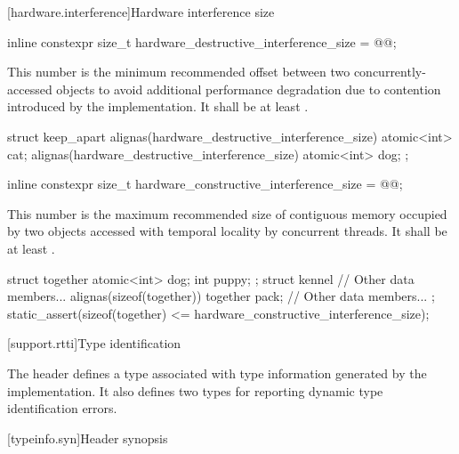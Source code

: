 [hardware.interference]{Hardware interference size}

%
\begin{itemdecl}
inline constexpr size_t hardware_destructive_interference_size = @\impdef{}@;
\end{itemdecl}

\pnum
This number is the minimum recommended offset
between two concurrently-accessed objects
to avoid additional performance degradation due to contention
introduced by the implementation.
It shall be at least .

%
\begin{example}
\begin{codeblock}
struct keep_apart {
  alignas(hardware_destructive_interference_size) atomic<int> cat;
  alignas(hardware_destructive_interference_size) atomic<int> dog;
};
\end{codeblock}
\end{example}

%
\begin{itemdecl}
inline constexpr size_t hardware_constructive_interference_size = @\impdef{}@;
\end{itemdecl}

\pnum
This number is the maximum recommended size of contiguous memory
occupied by two objects accessed with temporal locality by concurrent threads.
It shall be at least .

%
\begin{example}
\begin{codeblock}
struct together {
  atomic<int> dog;
  int puppy;
};
struct kennel {
  // Other data members...
  alignas(sizeof(together)) together pack;
  // Other data members...
};
static_assert(sizeof(together) <= hardware_constructive_interference_size);
\end{codeblock}
\end{example}

[support.rtti]{Type identification}

\pnum
The header  defines a
type associated with type information generated by the implementation.
It also defines two types for reporting dynamic type identification errors.

[typeinfo.syn]{Header  synopsis}

